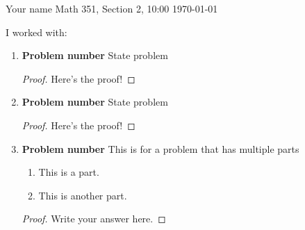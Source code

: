 \documentclass[12pt]{article}  %
\begin{document}

{\Large Your name} \hfill
{\large Math 351, Section 2, 10:00}  %
\hfill  \today

I worked with:


\begin{enumerate}
\item  \textbf{Problem number} State problem

\begin{proof}
Here's the proof!
\end{proof}

\item \textbf{Problem number} State problem

\begin{proof}
Here's the proof!
\end{proof}


\item \textbf{Problem number} This is for a problem that has multiple parts
\begin{enumerate}
\item This is a part.
\item This is another part.
\end{enumerate}


\begin{proof}%

Write your answer here. 

\end{proof}


\end{enumerate}

 
\end{document}
